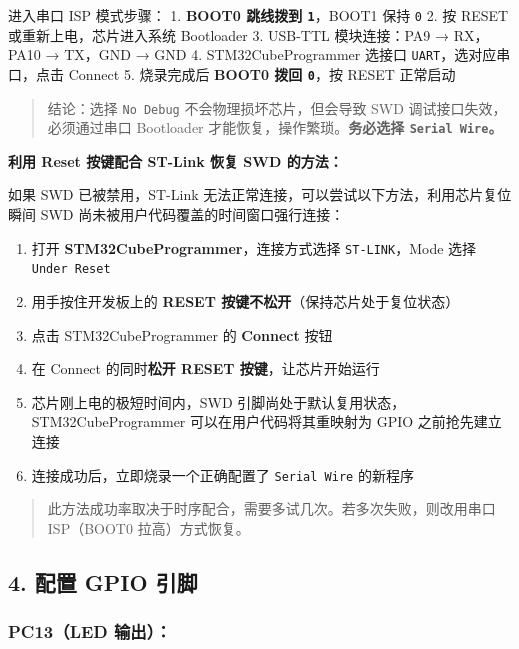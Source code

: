 \documentclass[
  chinese,
  UTF8,
  oneside,
  openany]{ctexbook}
\providecommand{\tightlist}{%
  \setlength{\itemsep}{0pt}\setlength{\parskip}{0pt}}
\begin{document}
进入串口 ISP 模式步骤： 1. \textbf{BOOT0 跳线拨到 \texttt{1}}，BOOT1
保持 \texttt{0} 2. 按 RESET 或重新上电，芯片进入系统 Bootloader 3.
USB-TTL 模块连接：PA9 → RX，PA10 → TX，GND → GND 4. STM32CubeProgrammer
选接口 \texttt{UART}，选对应串口，点击 Connect 5. 烧录完成后
\textbf{BOOT0 拨回 \texttt{0}}，按 RESET 正常启动

\begin{quote}
结论：选择 \texttt{No\ Debug} 不会物理损坏芯片，但会导致 SWD
调试接口失效，必须通过串口 Bootloader
才能恢复，操作繁琐。\textbf{务必选择 \texttt{Serial\ Wire}。}
\end{quote}

\textbf{利用 Reset 按键配合 ST-Link 恢复 SWD 的方法：}

如果 SWD 已被禁用，ST-Link
无法正常连接，可以尝试以下方法，利用芯片复位瞬间 SWD
尚未被用户代码覆盖的时间窗口强行连接：

\begin{enumerate}
\def\labelenumi{\arabic{enumi}.}
\tightlist
\item
  打开 \textbf{STM32CubeProgrammer}，连接方式选择 \texttt{ST-LINK}，Mode
  选择 \texttt{Under\ Reset}
\item
  用手按住开发板上的 \textbf{RESET 按键不松开}（保持芯片处于复位状态）
\item
  点击 STM32CubeProgrammer 的 \textbf{Connect} 按钮
\item
  在 Connect 的同时\textbf{松开 RESET 按键}，让芯片开始运行
\item
  芯片刚上电的极短时间内，SWD
  引脚尚处于默认复用状态，STM32CubeProgrammer 可以在用户代码将其重映射为
  GPIO 之前抢先建立连接
\item
  连接成功后，立即烧录一个正确配置了 \texttt{Serial\ Wire} 的新程序
\end{enumerate}

\begin{quote}
此方法成功率取决于时序配合，需要多试几次。若多次失败，则改用串口
ISP（BOOT0 拉高）方式恢复。
\end{quote}

\subsection{4. 配置 GPIO 引脚}\label{ux914dux7f6e-gpio-ux5f15ux811a}

\subsubsection{\texorpdfstring{\textbf{PC13（LED
输出）：}}{PC13（LED 输出）：}}\label{pc13led-ux8f93ux51fa}
\end{document}
